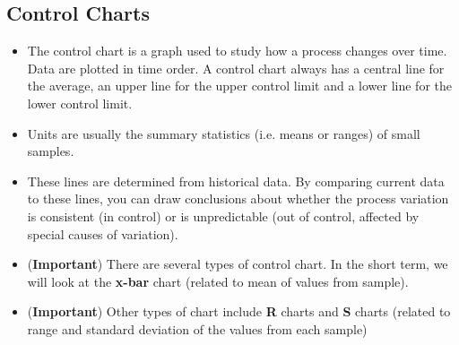 \documentclass[]{report}
\begin{document}
{\subsection{Control Charts}
{\large
	\begin{itemize}
		\item The control chart is a graph used to study how a process changes over time. Data are plotted in time order. A control chart always has a central line for the average, an upper line for the upper control limit and a lower line for the lower control limit. 
		\item Units are usually the summary statistics (i.e. means or ranges) of small samples.
		\item These lines are determined from historical data. By comparing current data to these lines, you can draw conclusions about whether the process variation is consistent (in control) or is unpredictable (out of control, affected by special causes of variation).
		
		
		\item (\textbf{Important}) There are several types of control chart. In the short term, we will look at the \textbf{x-bar} chart (related to mean of values from sample).
		\item (\textbf{Important}) Other types of chart include \textbf{R} charts and \textbf{S} charts (related to range and standard deviation of the values from each sample)
	\end{itemize}
}
\newpage
}
\end{document}
